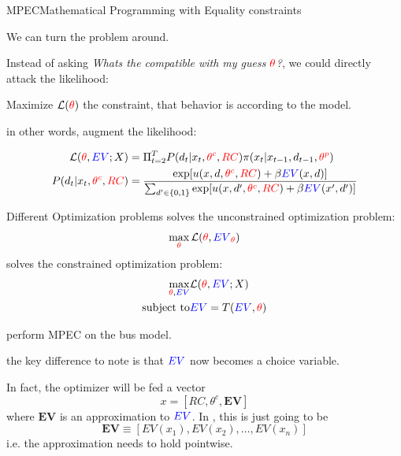 \documentclass[english]{beamer}
\begin{document}
\begin{frame}{MPEC}{Mathematical Programming with Equality constraints}

\begin{midi}
\item We can turn the problem around. 
\item Instead of asking \emph{Whats the  compatible with my guess ${\color{red}{\theta}}$?}, we could directly attack the likelihood: 
\item Maximize $\mathcal{L}({\color{red}{\theta}})$  the constraint, that behavior is  according to the model.
\item in other words, augment the likelihood:
\end{midi}

\begin{align*}
\mathcal{L}({\color{red}{\theta}},{\color{blue}{EV}};X) &= \Pi_{t=2}^T P(d_t|x_t,{\color{red}{\theta^c}},{\color{red}{RC}})\pi(x_t|x_{t-1},d_{t-1},{\color{red}{\theta^p}}) \\
P(d_t|x_t,{\color{red}{\theta^c}},{\color{red}{RC}}) &= \frac{\exp[u(x,d,{\color{red}{\theta^c}},{\color{red}{RC}}) + \beta{\color{blue}{EV}}(x,d)]}{\sum_{d'\in\{0,1\}}\exp[u(x,d',{\color{red}{\theta^c}},{\color{red}{RC}}) + \beta{\color{blue}{EV}}(x',d')]}
\end{align*}

\end{frame}

\begin{frame}{Different Optimization problems}
 solves the unconstrained optimization problem:
\begin{equation*}
\max_{{\color{red}{\theta}}} \mathcal{L}({\color{red}{\theta}},{\color{blue}{EV}}_{\color{red}{\theta}})
\end{equation*}
 solves the constrained optimization problem:
\begin{align*}
\max_{{\color{red}{\theta}},{\color{blue}{EV}}} & \mathcal{L}({\color{red}{\theta}},{\color{blue}{EV}};X) \\
\text{subject to} & {\color{blue}{EV}} = T({\color{blue}{EV}},{\color{red}{\theta}})
\end{align*}
\end{frame}

\begin{frame}{\cite{juddsu}}

\begin{midi}
\item \cite{juddsu} perform MPEC on the bus model.
\item the key difference to note is that ${\color{blue}{EV}}$ now becomes a choice variable.
\item In fact, the optimizer will be fed a vector
\begin{equation*}
x = [RC,\theta^c,\mathbf{EV}]
\end{equation*}
where $\mathbf{EV}$ is an approximation to ${\color{blue}{EV}}$. In \cite{juddsu}, this is just going to be 
\begin{equation*}
\mathbf{EV} \equiv [EV(x_1),EV(x_2),\dots,EV(x_n)]
\end{equation*}
i.e. the approximation needs to hold pointwise.
\end{midi}
\end{frame}
\end{document}
